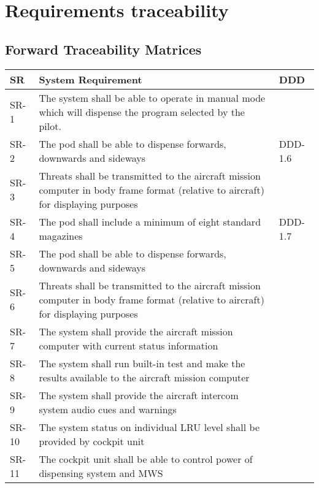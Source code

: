 \documentclass[Main]{subfiles}
\begin{document}
\chapter{Requirements traceability}


\section{Forward Traceability Matrices}


\begin{longtable}{p{} p{} p{}} \hline
SR & System Requirement & DDD \\\hline

SR-1 & The system shall be able to operate in manual mode which will dispense the program selected by the pilot. &  \\

SR-2 & The pod shall be able to dispense forwards, downwards and sideways & DDD-1.6 \\

SR-3 & Threats shall be transmitted to the aircraft mission computer in body frame format (relative to aircraft) for displaying purposes &  \\

SR-4 & The pod shall include a minimum of eight standard magazines & DDD-1.7 \\

SR-5 & The pod shall be able to dispense forwards, downwards and sideways & \\

SR-6 & Threats shall be transmitted to the aircraft mission computer in body frame format (relative to aircraft) for displaying purposes &  \\

SR-7 & The system shall provide the aircraft mission computer with current status information &  \\

SR-8 &  The system shall run built-in test and make the results available to the aircraft mission computer &  \\

SR-9 & The system shall provide the aircraft intercom system audio cues and warnings &  \\

SR-10 &  The system status on individual LRU level shall be provided by cockpit unit &  \\

SR-11 & The cockpit unit shall be able to control power of dispensing system and MWS &  \\


\end{longtable}
\end{document}
